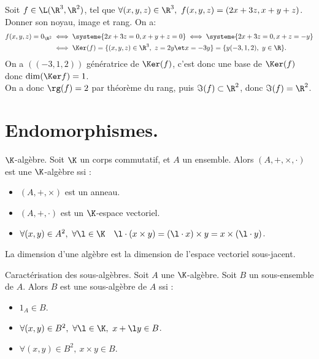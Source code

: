 \documentclass[11pt]{article}
\begin{document}
\pagebreak

\begin{ex}{}{}
    Soit $f\in\L(\R^3,\R^2)$, tel que $\forall (x,y,z)\in\R^3, ~ f(x,y,z)=(2x+3z, x+y+z)$. Donner son noyau, image et rang.
    \tcblower
    On a:
    \begin{align*}
        f(x,y,z) = 0_{\R^2} &\iff \systeme{2x+3z=0,x+y+z=0} \iff \systeme{2x+3z=0,x+z=-y}\\
        &\iff \Ker(f)=\{(x,y,z)\in\R^3, ~ z=2y \et x=-3y\} = \{y(-3,1,2), ~ y\in\R\}.
    \end{align*}
    On a $((-3,1,2))$ génératrice de $\Ker(f)$, c'est donc une base de $\Ker(f)$ donc $\dim(\Ker f)=1$.\\
    On a donc $\rg(f)=2$ par théorème du rang, puis $\Im(f) \subset \R^2$, donc $\Im(f)=\R^2$.
\end{ex}

\vspace*{-0.7cm}

\section{Endomorphismes.}

\begin{defi}{$\K$-algèbre.}{}
    Soit $\K$ un corps commutatif, et $A$ un ensemble. Alors $(A,+,\times,\cdot)$ est une $\K$-algèbre ssi :
    \begin{itemize}
        \item $(A,+,\times)$ est un anneau.
        \item $(A,+,\cdot)$ est un $\K$-espace vectoriel.
        \item $\forall (x,y)\in A^2, ~ \forall \l \in \K \quad \l\cdot(x\times y)=(\l\cdot x) \times y=x\times(\l\cdot y)$.
    \end{itemize}
    La dimension d'une algèbre est la dimension de l'espace vectoriel sous-jacent.
\end{defi}

\vspace*{-0.7cm}

\begin{prop}{Caractérisation des sous-algèbres.}{}
    Soit $A$ une $\K$-algèbre. Soit $B$ un sous-ensemble de $A$. Alors $B$ est une sous-algèbre de $A$ ssi :
    \begin{itemize}
        \item $1_A\in B$.
        \item $\forall (x,y)\in B^2, ~ \forall \l \in \K, ~ x+\l y \in B$.
        \item $\forall (x,y)\in B^2, ~ x\times y \in B$.
    \end{itemize}
\end{prop}
\end{document}
